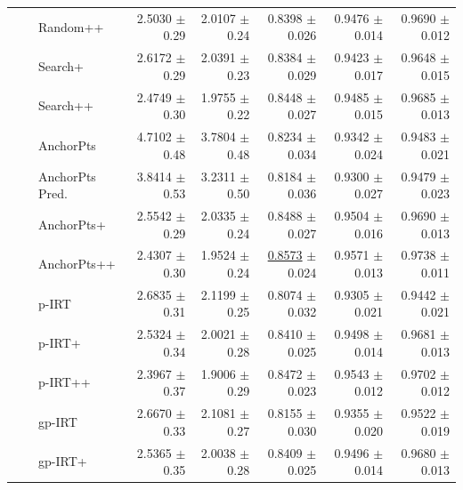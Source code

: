 \begin{longtable}{llp{}rrrrr}
 &  & Random++ & 2.5030 {\scriptsize $\pm$ 0.29} & 2.0107 {\scriptsize $\pm$ 0.24} & 0.8398 {\scriptsize $\pm$ 0.026} & 0.9476 {\scriptsize $\pm$ 0.014} & 0.9690 {\scriptsize $\pm$ 0.012} \\
 &  & Search+ & 2.6172 {\scriptsize $\pm$ 0.29} & 2.0391 {\scriptsize $\pm$ 0.23} & 0.8384 {\scriptsize $\pm$ 0.029} & 0.9423 {\scriptsize $\pm$ 0.017} & 0.9648 {\scriptsize $\pm$ 0.015} \\
 &  & Search++ & 2.4749 {\scriptsize $\pm$ 0.30} & 1.9755 {\scriptsize $\pm$ 0.22} & 0.8448 {\scriptsize $\pm$ 0.027} & 0.9485 {\scriptsize $\pm$ 0.015} & 0.9685 {\scriptsize $\pm$ 0.013} \\
 &  & AnchorPts & 4.7102 {\scriptsize $\pm$ 0.48} & 3.7804 {\scriptsize $\pm$ 0.48} & 0.8234 {\scriptsize $\pm$ 0.034} & 0.9342 {\scriptsize $\pm$ 0.024} & 0.9483 {\scriptsize $\pm$ 0.021} \\
 &  & AnchorPts Pred. & 3.8414 {\scriptsize $\pm$ 0.53} & 3.2311 {\scriptsize $\pm$ 0.50} & 0.8184 {\scriptsize $\pm$ 0.036} & 0.9300 {\scriptsize $\pm$ 0.027} & 0.9479 {\scriptsize $\pm$ 0.023} \\
 &  & AnchorPts+ & 2.5542 {\scriptsize $\pm$ 0.29} & 2.0335 {\scriptsize $\pm$ 0.24} & 0.8488 {\scriptsize $\pm$ 0.027} & 0.9504 {\scriptsize $\pm$ 0.016} & 0.9690 {\scriptsize $\pm$ 0.013} \\
 &  & AnchorPts++ & 2.4307 {\scriptsize $\pm$ 0.30} & 1.9524 {\scriptsize $\pm$ 0.24} & \underline{0.8573} {\scriptsize $\pm$ 0.024} & 0.9571 {\scriptsize $\pm$ 0.013} & 0.9738 {\scriptsize $\pm$ 0.011} \\
 &  & p-IRT & 2.6835 {\scriptsize $\pm$ 0.31} & 2.1199 {\scriptsize $\pm$ 0.25} & 0.8074 {\scriptsize $\pm$ 0.032} & 0.9305 {\scriptsize $\pm$ 0.021} & 0.9442 {\scriptsize $\pm$ 0.021} \\
 &  & p-IRT+ & 2.5324 {\scriptsize $\pm$ 0.34} & 2.0021 {\scriptsize $\pm$ 0.28} & 0.8410 {\scriptsize $\pm$ 0.025} & 0.9498 {\scriptsize $\pm$ 0.014} & 0.9681 {\scriptsize $\pm$ 0.013} \\
 &  & p-IRT++ & 2.3967 {\scriptsize $\pm$ 0.37} & 1.9006 {\scriptsize $\pm$ 0.29} & 0.8472 {\scriptsize $\pm$ 0.023} & 0.9543 {\scriptsize $\pm$ 0.012} & 0.9702 {\scriptsize $\pm$ 0.012} \\
 &  & gp-IRT & 2.6670 {\scriptsize $\pm$ 0.33} & 2.1081 {\scriptsize $\pm$ 0.27} & 0.8155 {\scriptsize $\pm$ 0.030} & 0.9355 {\scriptsize $\pm$ 0.020} & 0.9522 {\scriptsize $\pm$ 0.019} \\
 &  & gp-IRT+ & 2.5365 {\scriptsize $\pm$ 0.35} & 2.0038 {\scriptsize $\pm$ 0.28} & 0.8409 {\scriptsize $\pm$ 0.025} & 0.9496 {\scriptsize $\pm$ 0.014} & 0.9680 {\scriptsize $\pm$ 0.013} \\

\end{longtable}
